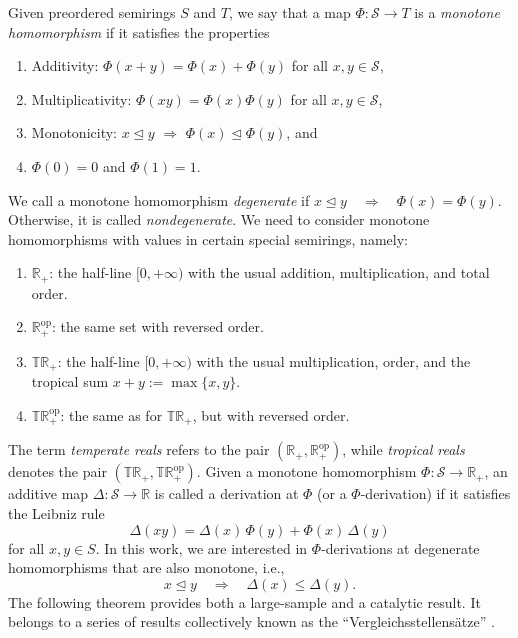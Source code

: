 \documentclass[aps,pra,11pt,onecolumn,nofootinbib,tightenlines]{revtex4-2}
\theoremstyle{definition}
\newcommand{\cS}{\mathcal{S}}
\newcommand{\rleq}{\trianglelefteq}
\begin{document}
Given preordered semirings $S$ and $T$, we say that a map $\Phi:\cS\to T$ is a {\it monotone homomorphism} if it satisfies the properties
\begin{enumerate}
\item Additivity: $\Phi(x+y)=\Phi(x)+\Phi(y)$ for all $x,y\in \cS$,
\item Multiplicativity: $\Phi(xy)=\Phi(x)\Phi(y)$ for all $x,y\in \cS$,
\item Monotonicity: $x\rleq y$ $\Rightarrow$ $\Phi(x)\rleq\Phi(y)$, and
\item $\Phi(0)=0$ and $\Phi(1)=1$.
\end{enumerate}
We call a monotone homomorphism \textit{degenerate} if $ x \rleq y \quad \Rightarrow \quad \Phi(x) = \Phi(y)$. Otherwise, it is called \textit{nondegenerate}.
We need to consider monotone homomorphisms with values in certain special semirings, namely:
\begin{enumerate}
    \item $\mathbb{R}_+$: the half-line $[0,+\infty)$ with the usual addition, multiplication, and total order.
    \item $\mathbb{R}_+^{\mathrm{op}}$: the same set with reversed order. 
    \item $\mathbb{T}\mathbb{R}_+$: the half-line $[0,+\infty)$ with the usual multiplication, order, and the tropical sum $x + y := \max\{x,y\}$.
    \item $\mathbb{T}\mathbb{R}_+^{\mathrm{op}}$: the same as for $\mathbb{T}\mathbb{R}_+$, but with reversed order.
\end{enumerate}
The term \emph{temperate reals} refers to the pair $(\mathbb{R}_+, \mathbb{R}_+^{\mathrm{op}})$, while \emph{tropical reals} denotes the pair $(\mathbb{T}\mathbb{R}_+, \mathbb{T}\mathbb{R}_+^{\mathrm{op}})$.
Given a monotone homomorphism $\Phi: \cS \to \mathbb{R}_+$, an additive map $\Delta: \cS \to \mathbb{R}$ is called a derivation at $\Phi$ (or a $\Phi$-derivation) if it satisfies the Leibniz rule
\begin{equation}
    \Delta(xy) = \Delta(x)\,\Phi(y) + \Phi(x)\,\Delta(y)
\end{equation}
for all $x, y \in S$.
In this work, we are interested in $\Phi$-derivations at degenerate homomorphisms that are also monotone, i.e.,
\begin{equation}
    x \rleq y \quad \Rightarrow \quad \Delta(x) \leq \Delta(y).
\end{equation}
The following theorem provides both a large-sample and a catalytic result. It belongs to a series of results collectively known as the ``Vergleichsstellens\"{a}tze'' \cite{fritz2023abstractII}.
\end{document}
